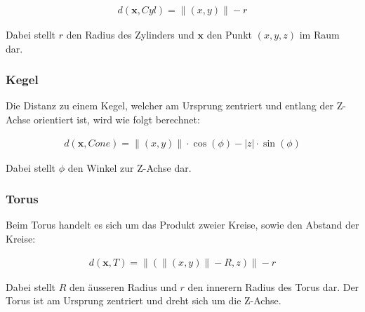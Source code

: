 \begin{gather}
    d(\bm{x}, Cyl) = \|(x, y)\| - r
\end{gather}

Dabei stellt $r$ den Radius des Zylinders und $\bm{x}$ den Punkt $(x,y,z)$ im
Raum dar.

\subsubsection{Kegel}
\label{ssubsec:implicit_surfaces_primitives_cone}

Die Distanz zu einem Kegel, welcher am Ursprung zentriert und entlang
der Z-Achse orientiert ist, wird wie folgt berechnet:

\begin{gather}
    d(\bm{x}, Cone) = \|(x, y)\| \cdot \cos(\phi) - |z| \cdot \sin(\phi)
\end{gather}

Dabei stellt $\phi$ den Winkel zur Z-Achse dar.

\subsubsection{Torus}
\label{ssubsec:implicit_surfaces_primitives_torus}

Beim Torus handelt es sich um das Produkt zweier Kreise, sowie den Abstand der Kreise:

\begin{gather}
    d(\bm{x}, T) = \|(\|(x, y)\| - R, z)\| - r
\end{gather}

Dabei stellt $R$ den äusseren Radius und $r$ den innerern Radius des
Torus dar.
Der Torus ist am Ursprung zentriert und dreht sich um die Z-Achse.
